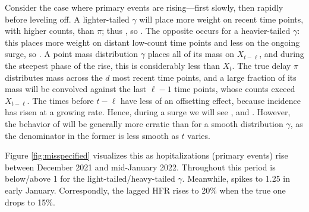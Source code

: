 \documentclass{article}
\begin{document}
Consider the case where primary events are rising---first slowly, then rapidly
before leveling off. A lighter-tailed $\gamma$ will place more weight
on recent time points, with higher counts, than $\pi$; thus , so . The opposite occurs for a heavier-tailed $\gamma$: this
places more weight on distant low-count time points and less on the ongoing
surge, so . A point mass distribution $\gamma$ places
all of its mass on $X_{t-\ell}$, and during the steepest phase of the rise, this
is considerably less than $X_t$. The true delay $\pi$ distributes mass across
the  $d$ most recent time points, and a large fraction of its mass will be
convolved against the last $\ell-1$ time points, whose counts exceed
$X_{t-\ell}$. The times before $t-\ell$ have less of an offsetting effect, 
because incidence has risen at a  growing rate. Hence, during a surge we will 
see , and . However, the behavior of  will be generally more
erratic than  for a smooth distribution $\gamma$, as the
denominator in the former is less smooth as $t$ varies. 

Figure \ref{fig:misspecified} visualizes this as hopitalizations (primary
events) rise between December 2021 and mid-January 2022. Throughout this period
 is below/above 1 for the light-tailed/heavy-tailed
$\gamma$. Meanwhile,  spikes to 1.25 in early January.  
Correspondly, the lagged HFR rises to 20\% when the true one drops to 15\%.    
\end{document}
